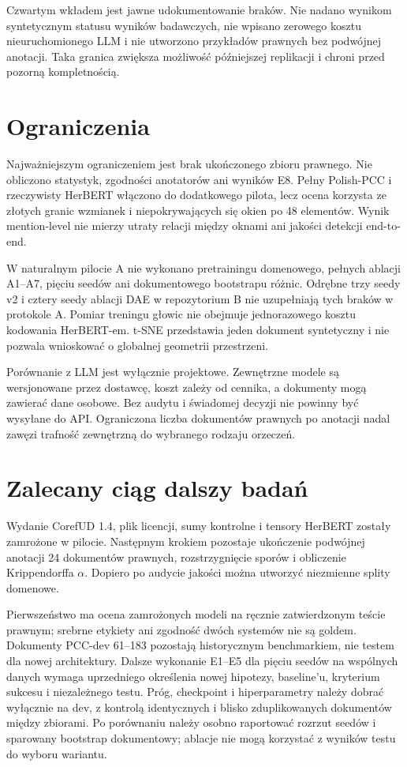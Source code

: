 Czwartym wkładem jest jawne udokumentowanie braków. Nie nadano wynikom syntetycznym statusu wyników badawczych, nie wpisano zerowego kosztu nieuruchomionego LLM i nie utworzono przykładów prawnych bez podwójnej anotacji. Taka granica zwiększa możliwość późniejszej replikacji i chroni przed pozorną kompletnością.

\section{Ograniczenia}

Najważniejszym ograniczeniem jest brak ukończonego zbioru prawnego. Nie obliczono statystyk, zgodności anotatorów ani wyników E8. Pełny Polish-PCC i rzeczywisty HerBERT włączono do dodatkowego pilota, lecz ocena korzysta ze złotych granic wzmianek i niepokrywających się okien po 48 elementów. Wynik mention-level nie mierzy utraty relacji między oknami ani jakości detekcji end-to-end.

W naturalnym pilocie A nie wykonano pretrainingu domenowego, pełnych ablacji A1--A7, pięciu seedów ani dokumentowego bootstrapu różnic. Odrębne trzy seedy v2 i cztery seedy ablacji DAE w repozytorium B nie uzupełniają tych braków w protokole A. Pomiar treningu głowic nie obejmuje jednorazowego kosztu kodowania HerBERT-em. t-SNE przedstawia jeden dokument syntetyczny i nie pozwala wnioskować o globalnej geometrii przestrzeni.

Porównanie z LLM jest wyłącznie projektowe. Zewnętrzne modele są wersjonowane przez dostawcę, koszt zależy od cennika, a dokumenty mogą zawierać dane osobowe. Bez audytu i świadomej decyzji nie powinny być wysyłane do API. Ograniczona liczba dokumentów prawnych po anotacji nadal zawęzi trafność zewnętrzną do wybranego rodzaju orzeczeń.

\section{Zalecany ciąg dalszy badań}

Wydanie CorefUD 1.4, plik licencji, sumy kontrolne i tensory HerBERT zostały zamrożone w pilocie. Następnym krokiem pozostaje ukończenie podwójnej anotacji 24 dokumentów prawnych, rozstrzygnięcie sporów i obliczenie Krippendorffa $\alpha$. Dopiero po audycie jakości można utworzyć niezmienne splity domenowe.

Pierwszeństwo ma ocena zamrożonych modeli na ręcznie zatwierdzonym teście prawnym; srebrne etykiety ani zgodność dwóch systemów nie są goldem. Dokumenty PCC-dev 61--183 pozostają historycznym benchmarkiem, nie testem dla nowej architektury. Dalsze wykonanie E1--E5 dla pięciu seedów na wspólnych danych wymaga uprzedniego określenia nowej hipotezy, baseline'u, kryterium sukcesu i niezależnego testu. Próg, checkpoint i hiperparametry należy dobrać wyłącznie na dev, z kontrolą identycznych i blisko zduplikowanych dokumentów między zbiorami. Po porównaniu należy osobno raportować rozrzut seedów i sparowany bootstrap dokumentowy; ablacje nie mogą korzystać z wyników testu do wyboru wariantu.

